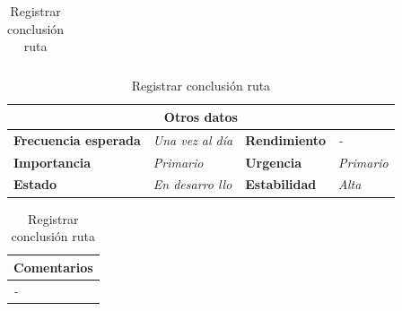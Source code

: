 \documentclass[12pt,spanish]{article}
\begin{document}
\begin{table}[H]
\begin{tabular}{|m{12pt}|m{19.66cm}|}
		
	\end{tabular}
	
	\vspace{0.5cm}
	
	\begin{tabular}{|m{3.75cm}|m{3.75cm}|m{3.75cm}|m{3.8cm}|}
		\hline
		\multicolumn{4}{|c|}{\textbf{Otros datos}} \\
		\hline
		\textbf{Frecuencia esperada} & \textit{Una vez al día} & \textbf{Rendimiento} & \textit{-} \\
		\hline
		\textbf{Importancia} & \textit{Primario} & \textbf{Urgencia} & \textit{Primario} \\
		\hline
		\textbf{Estado} & \textit{En desarro
		llo} & \textbf{Estabilidad} & \textit{Alta} \\
		\hline
	\end{tabular}
	
	\vspace{1cm}
	
	\begin{tabular}{|m{16.2cm}|}
		\hline
		\textbf{Comentarios} \\
		\hline
		\textit{-} \\
		\hline
	\end{tabular}
	
	\caption{Registrar conclusión ruta}
	
\end{table}
\end{document}
